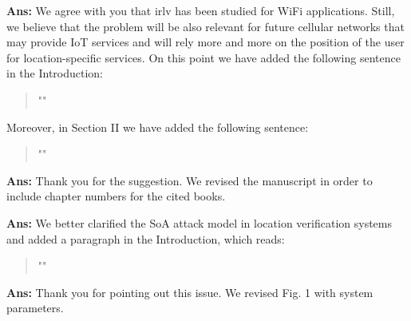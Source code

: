 \documentclass[draftcls,onecolumn,12pt]{IEEEtran}
\newcounter{revc}
\newcommand{\revp}[1]{\zref[revcontent]{#1}}
\begin{document}
{
{\bf Ans:} We agree with you that \ac{irlv} has been studied for WiFi applications. Still, we believe that the problem will be also relevant for future cellular networks that may provide IoT services and will rely more and more on the position of the user for location-specific services. On this point we have added the following sentence in the Introduction:
\begin{quote}
    "\revp{WiFi}"
\end{quote}
Moreover, in Section II we have added the following sentence:
\begin{quote}
    "\revp{WiFi2}"
\end{quote}
\vspace{5mm} %
\begin{framed}
\end{framed}

{\bf Ans:} Thank you for the suggestion. We revised the manuscript in order to include chapter numbers for the cited books.

\vspace{5mm} %
\begin{framed}
\end{framed}
{\bf Ans:} We better clarified the SoA attack model in location verification systems and added a paragraph in the Introduction, which reads:
\begin{quote}
"\revp{attack1}"
\end{quote}


\vspace{5mm} %
\begin{framed}
\end{framed}

{\bf Ans:} Thank you for pointing out this issue. We revised Fig. 1 with system parameters.

\vspace{5mm} %
\begin{framed}
\end{framed}

}
\end{document}
